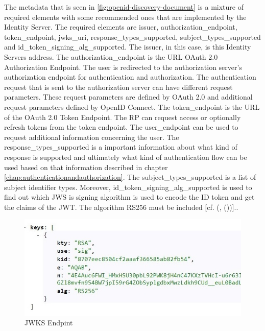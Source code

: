 The metadata that is seen in \ref{fig:openid-discovery-document} is a mixture of required elements with some recommended ones that are implemented by the Identity Server. The required elements are issuer, authorization\_endpoint, token\_endpoint, jwks\_uri, response\_types\_supported, subject\_types\_supported and id\_token\_signing\_alg\_supported. The issuer, in this case, is this Identity Servers address. The authorization\_endpoint is the URL OAuth 2.0 Authorization Endpoint. The user is redirected to the authorization server's authorization endpoint for authentication and authorization. The authentication request that is sent to the authorization server can have different request parameters. These request parameters are defined by OAuth 2.0 and additional request parameters defined by OpenID Connect. The token\_endpoint is the URL of the OAuth 2.0 Token Endpoint. The RP can request access or optionally refresh tokens from the token endpoint. The user\_endpoint can be used to request additional information concerning the user. The response\_types\_supported is a important information about what kind of response is supported and ultimately what kind of authentication flow can be used based on that information described in chapter \ref{chap:authenticationandauthorization}. The subject\_types\_supported is a list of subject identifier types. Moreover, id\_token\_signing\_alg\_supported is used to find out which JWS is signing algorithm is used to encode the ID token and get the claims of the JWT. The algorithm RS256 must be included [cf. (\cite{Sakimura:OIDCC}, (\cite{Sakimura:OIDCD}))].. 

\begin{figure}[h]
	\centering
	\includegraphics[width=0.7\linewidth]{images/jwkDiscovoryDocument}
	\caption{JWKS Endpint}
	\label{fig:jwkdiscovorydocument}
\end{figure}

